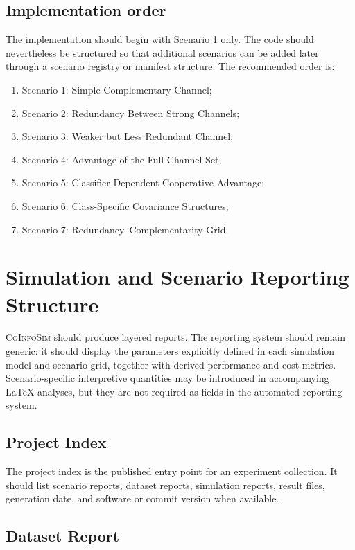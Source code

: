 \documentclass[11pt,a4paper]{article}
\newcommand{\CoInfoSim}{\textsc{CoInfoSim}}
\begin{document}
\subsection{Implementation order}

The implementation should begin with Scenario 1 only. The code should nevertheless be structured so that additional scenarios can be added later through a scenario registry or manifest structure. The recommended order is:
\begin{enumerate}
    \item Scenario 1: Simple Complementary Channel;
    \item Scenario 2: Redundancy Between Strong Channels;
    \item Scenario 3: Weaker but Less Redundant Channel;
    \item Scenario 4: Advantage of the Full Channel Set;
    \item Scenario 5: Classifier-Dependent Cooperative Advantage;
    \item Scenario 6: Class-Specific Covariance Structures;
    \item Scenario 7: Redundancy--Complementarity Grid.
\end{enumerate}

\section{Simulation and Scenario Reporting Structure}

\CoInfoSim{} should produce layered reports. The reporting system should remain generic: it should display the parameters explicitly defined in each simulation model and scenario grid, together with derived performance and cost metrics. Scenario-specific interpretive quantities may be introduced in accompanying LaTeX analyses, but they are not required as fields in the automated reporting system.

\subsection{Project Index}

The project index is the published entry point for an experiment collection. It should list scenario reports, dataset reports, simulation reports, result files, generation date, and software or commit version when available.

\subsection{Dataset Report}
\end{document}
